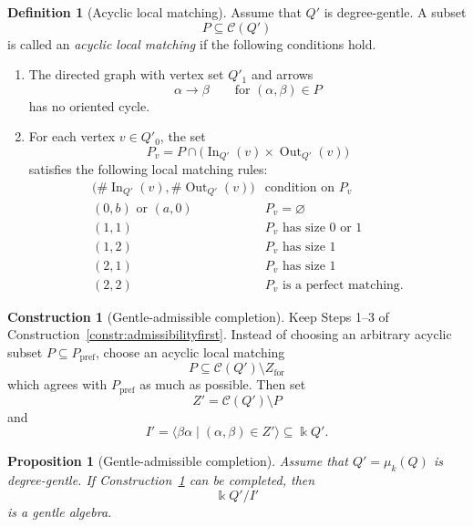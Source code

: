 \documentclass[11pt]{article}
\newcommand{\K}{\Bbbk}
\theoremstyle{plain}
\newtheorem{proposition}[theorem]{Proposition}
\theoremstyle{definition}
\newtheorem{definition}[theorem]{Definition}
\newtheorem{construction}[theorem]{Construction}
\theoremstyle{remark}
\begin{document}
\begin{definition}[Acyclic local matching]
\label{def:acyclic-local-matching}
Assume that \(Q'\) is degree-gentle.  A subset
\[
  P\subseteq \mathcal C(Q')
\]
is called an \emph{acyclic local matching} if the following conditions hold.

\begin{enumerate}[label=(\alph*),leftmargin=2.5em]
  \item The directed graph with vertex set \(Q'_1\) and arrows
  \[
    \alpha\to \beta
    \qquad\text{for }(\alpha,
    \beta)\in P
  \]
  has no oriented cycle.

  \item For each vertex \(v\in Q'_0\), the set
  \[
    P_v
    =
    P\cap
    \bigl(\operatorname{In}_{Q'}(v)\times
          \operatorname{Out}_{Q'}(v)\bigr)
  \]
  satisfies the following local matching rules:
  \[
  \begin{array}{c|c}
  \bigl(\#\operatorname{In}_{Q'}(v),
        \#\operatorname{Out}_{Q'}(v)\bigr)
  & \text{condition on }P_v \\ \hline
  (0,b)\text{ or }(a,0) & P_v=\varnothing \\
  (1,1) & P_v \text{ has size }0\text{ or }1 \\
  (1,2) & P_v \text{ has size }1 \\
  (2,1) & P_v \text{ has size }1 \\
  (2,2) & P_v \text{ is a perfect matching.}
  \end{array}
  \]
\end{enumerate}
\end{definition}

\begin{construction}[Gentle-admissible completion]
\label{constr:gentle-admissible-completion}
Keep Steps 1--3 of Construction~\ref{constr:admissibilityfirst}.  Instead of
choosing an arbitrary acyclic subset \(P\subseteq P_{\mathrm{pref}}\), choose an
acyclic local matching
\[
  P\subseteq \mathcal C(Q')\setminus Z_{\mathrm{for}}
\]
which agrees with \(P_{\mathrm{pref}}\) as much as possible.  Then set
\[
  Z'=\mathcal C(Q')\setminus P
\]
and
\[
  I'
  =
  \langle \beta\alpha\mid (\alpha,\beta)\in Z'\rangle
  \subseteq \K Q'.
\]
\end{construction}

\begin{proposition}[Gentle-admissible completion]
\label{prop:gentle-admissible-completion}
Assume that \(Q'=\mu_k(Q)\) is degree-gentle.  If
Construction~\ref{constr:gentle-admissible-completion} can be completed, then
\[
  \K Q'/I'
\]
is a gentle algebra.
\end{proposition}
\end{document}
